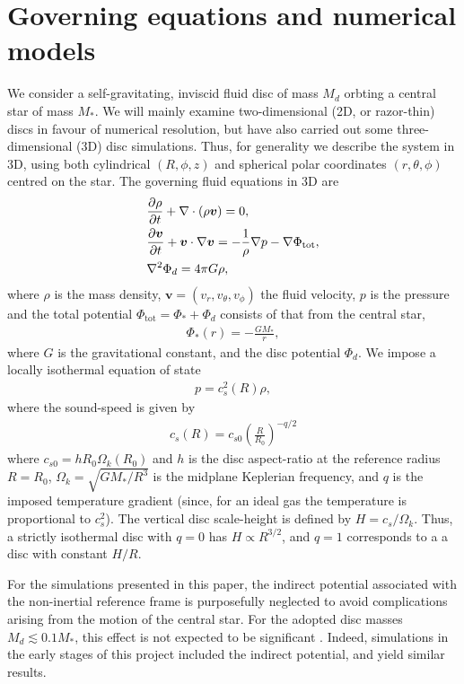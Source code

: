 \section{Governing equations and numerical models}\label{model} 
We consider a self-gravitating, inviscid fluid disc of mass $M_d$ 
orbting a central star of mass $M_*$. We will mainly examine two-dimensional
(2D, or razor-thin) discs in favour of numerical 
resolution, but have also carried out some three-dimensional (3D) disc
simulations. Thus, for generality we describe the system in
3D, using both cylindrical $(R,\phi,z)$ and spherical polar
coordinates $(r,\theta,\phi)$ centred on the star. 
The governing fluid equations in 3D are  
\begin{align}
  &\frac{\partial\rho}{\partial t} + \nabla\cdot\left(\rho\bm{v}\right) =
  0,\label{cont_eq}\\
  &\frac{\partial\bm{v}}{\partial t} + \bm{v}\cdot\nabla\bm{v} = -\frac{1}{\rho}\nabla
  p -\nabla \Phi_\mathrm{tot}\label{mom_eq},\\ 
  & \nabla^2\Phi_d = 4 \pi G \rho \label{poisson}, 
\end{align}
where $\rho$ is the mass density, $\bm{v}=(v_r,v_\theta,v_\phi)$ the
fluid velocity, $p$ is the pressure and the total potential
$\Phi_\mathrm{tot} = \Phi_* + \Phi_d$ consists of that from the
central star, 
\begin{align}
  \Phi_*(r) = -\frac{GM_*}{r}, 
\end{align}
where $G$ is the gravitational constant,  and the disc potential
$\Phi_d$. We impose a locally isothermal equation of state 
\begin{align}
  p = c_s^2(R)\rho,
\end{align}
where the sound-speed is given by 
\begin{align}\label{sound-speed}
  c_s(R) = c_{s0}\left(\frac{R}{R_0}\right)^{-q/2}
\end{align}
where $c_{s0} = h R_0\Omega_k(R_0)$ and 
$h$ is the disc aspect-ratio at the reference radius $R=R_0$, 
$\Omega_k=\sqrt{GM_*/R^3}$ is the midplane Keplerian frequency, and
$q$ is the imposed temperature gradient (since, for an ideal gas the
temperature is proportional to $c_s^2$). The vertical disc scale-height is
defined by $H=c_s/\Omega_k$. Thus, a strictly isothermal disc with
$q=0$ has $H\propto R^{3/2}$, and $q=1$ corresponds to a 
a disc with constant $H/R$. 

For the simulations presented in this paper, the indirect potential
associated with the non-inertial reference frame is purposefully 
neglected to avoid complications arising from the motion of the
central star. For the adopted disc masses $M_d\lesssim 0.1 M_*$, this
effect is not expected to be significant \citep{adams89,shu90}. Indeed,
simulations in the early stages of this project included the indirect
potential, and yield similar results.  

